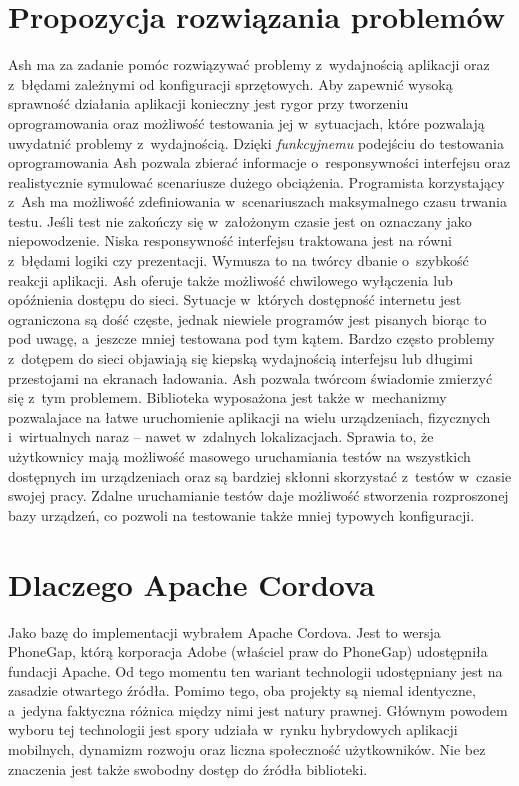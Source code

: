 \documentclass[brudnopis]{xmgr}
\begin{document}
\section{Propozycja rozwiązania problemów}
Ash ma za zadanie pomóc rozwiązywać problemy z~wydajnością aplikacji oraz z~błędami zależnymi od konfiguracji sprzętowych. Aby
zapewnić wysoką sprawność działania aplikacji konieczny jest rygor przy tworzeniu
oprogramowania oraz możliwość testowania jej w~sytuacjach, które pozwalają
uwydatnić problemy z~wydajnością. Dzięki \textit{funkcyjnemu} podejściu do testowania
oprogramowania Ash pozwala zbierać informacje o~responsywności interfejsu
oraz realistycznie symulować scenariusze dużego obciążenia. Programista
korzystający z~Ash ma możliwość zdefiniowania w~scenariuszach maksymalnego
czasu trwania testu. Jeśli test nie zakończy się w~założonym czasie jest on oznaczany jako niepowodzenie. Niska responsywność interfejsu traktowana jest na równi z~błędami
logiki czy prezentacji. Wymusza to na twórcy dbanie o~szybkość reakcji aplikacji.
Ash oferuje także możliwość chwilowego wyłączenia lub opóźnienia dostępu do
sieci. Sytuacje w~których dostępność internetu jest ograniczona są dość częste,
jednak niewiele programów jest pisanych biorąc to pod uwagę, a~jeszcze mniej 
testowana pod tym kątem. Bardzo często problemy z~dotępem do sieci objawiają się kiepską
wydajnością interfejsu lub długimi przestojami na ekranach ładowania. Ash pozwala
twórcom świadomie zmierzyć się z~tym problemem. Biblioteka wyposażona jest także w~mechanizmy pozwalajace na łatwe uruchomienie aplikacji na wielu urządzeniach, fizycznych i~wirtualnych naraz -- nawet w~zdalnych lokalizacjach. Sprawia to, że
użytkownicy mają możliwość masowego uruchamiania testów na wszystkich
dostępnych im urządzeniach oraz są bardziej skłonni skorzystać z~testów w~czasie
swojej pracy. Zdalne uruchamianie testów daje możliwość stworzenia
rozproszonej bazy urządzeń, co pozwoli na testowanie także mniej typowych
konfiguracji.

\section{Dlaczego Apache Cordova}
Jako bazę do implementacji wybrałem Apache Cordova. Jest to
wersja PhoneGap, którą korporacja Adobe (właściel praw do PhoneGap) udostępniła
fundacji Apache. Od tego momentu ten wariant technologii udostępniany jest
na zasadzie otwartego źródła. Pomimo tego, oba projekty są niemal identyczne, a~jedyna faktyczna różnica między nimi jest natury prawnej. Głównym powodem
wyboru tej technologii jest spory udziała w~rynku hybrydowych aplikacji mobilnych,
dynamizm rozwoju oraz liczna społeczność użytkowników. Nie bez znaczenia jest także swobodny dostęp do źródła biblioteki.
\end{document}

